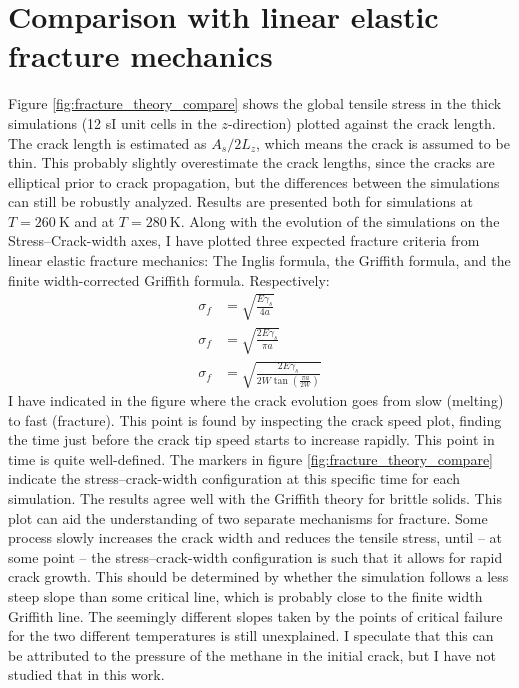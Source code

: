 \section{Comparison with linear elastic fracture mechanics}
Figure \ref{fig:fracture_theory_compare} shows the global tensile stress in the thick simulations (12 sI unit cells in the $z$-direction) plotted against the crack length. The crack length is estimated as $A_s/2L_z$, which means the crack is assumed to be thin. This probably slightly overestimate the crack lengths, since the cracks are elliptical prior to crack propagation, but the differences between the simulations can still be robustly analyzed. Results are presented both for simulations at $T= \SI{260}{\kelvin}$ and at $T=\SI{280}{\kelvin}$. Along with the evolution of the simulations on the Stress--Crack-width axes, I have plotted three expected fracture criteria from linear elastic fracture mechanics: The Inglis formula, the Griffith formula, and the finite width-corrected Griffith formula. Respectively:
\begin{align}
\sigma_f & = \sqrt{\frac{E\gamma_s}{4a}} \\
\sigma_f & = \sqrt{\frac{2E\gamma_s}{\pi a}} \\
\sigma_f & = \sqrt{\frac{2E\gamma_s}{2W\tan\left( \frac{\pi a}{2W}\right)}}
\end{align}
 I have indicated in the figure where the crack evolution goes from slow (melting) to fast (fracture). This point is found by inspecting the crack speed plot, finding the time just before the crack tip speed starts to increase rapidly. This point in time is quite well-defined. The markers in figure \ref{fig:fracture_theory_compare} indicate the stress--crack-width configuration at this specific time for each simulation. 
 The results agree well with the Griffith theory for brittle solids. This plot can aid the understanding of two separate mechanisms for fracture. Some process slowly increases the crack width and reduces the tensile stress, until -- at some point -- the stress--crack-width configuration is such that it allows for rapid crack growth. This should be determined by whether the simulation follows a less steep slope than some critical line, which is probably close to the finite width Griffith line. The seemingly different slopes taken by the points of critical failure for the two different temperatures is still unexplained. I speculate that this can be attributed to the pressure of the methane in the initial crack, but I have not studied that in this work.
%
